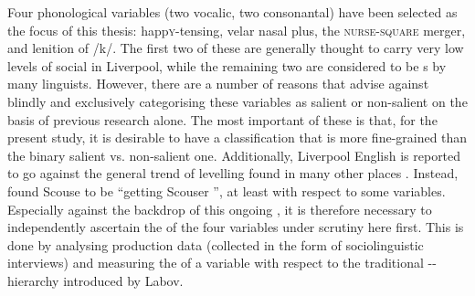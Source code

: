 Four phonological variables (two vocalic, two consonantal) have been selected as the focus of this thesis: happ\textsc{y}-tensing, velar nasal plus, the \textsc{nurse}-\textsc{square} merger, and lenition of /k/.
The first two of these are generally thought to carry very low levels of social  in Liverpool, while the remaining two are considered to be s by many linguists.
However, there are a number of reasons that advise against blindly and exclusively categorising these variables as salient  or non-salient  on the basis of previous research alone.
The most important of these is that, for the present study, it is desirable to have a classification that is more fine-grained than the binary salient  vs. non-salient  one.
Additionally, Liverpool English is reported to go against the general trend of  levelling found in many other places \parencite{kerswill2003}.
Instead, \textcite[237]{watson2007a} found Scouse to be ``getting Scouser '', at least with respect to some variables.
Especially against the backdrop of this ongoing , it is therefore necessary to independently ascertain the  of the four variables under scrutiny here first.
This is done by analysing production data (collected in the form of sociolinguistic interviews) and measuring the  of a variable with respect to the traditional -- hierarchy introduced by Labov.

